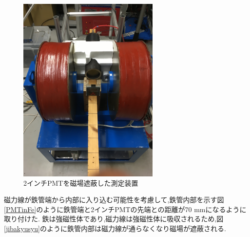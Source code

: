 \begin{figure}[tbp]
	\centering
		\includegraphics[width=7cm]{fig/iguchi/2inchinFe.jpg}
	\caption{2インチPMTを磁場遮蔽した測定装置}
	\label{2inchinFe}
\end{figure}

磁力線が鉄管端から内部に入り込む可能性を考慮して,鉄管内部を示す図\ref{PMTinFe}のように鉄管端と2インチPMTの先端との距離が70 mmになるように取り付けた.
鉄は強磁性体であり,磁力線は強磁性体に吸収されるため,図\ref{jibakyusyu}のように鉄管内部は磁力線が通らなくなり磁場が遮蔽される.

